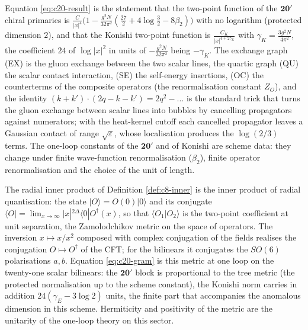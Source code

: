 \begin{remark}
Equation \eqref{eq:c20-result} is the statement that the two-point function of the $\mathbf{20'}$ chiral primaries is $\frac{C}{|x|^4}\big(1-\frac{g^2N}{32\pi^2}(\tfrac{27}2+4\log\tfrac32-8\beta_2)\big)$ with no logarithm (protected dimension $2$), and that the Konishi two-point function is $\frac{C_K}{|x|^{4+2\gamma_K}}$ with $\gamma_K=\frac{3g^2N}{4\pi^2}$, the coefficient $24$ of $\log|x|^2$ in units of $-\frac{g^2N}{32\pi^2}$ being $-\gamma_K$. The exchange graph (EX) is the gluon exchange between the two scalar lines, the quartic graph (QU) the scalar contact interaction, (SE) the self-energy insertions, (OC) the counterterms of the composite operators (the renormalisation constant $Z_O$), and the identity $(k+k')\cdot(2q-k-k')=2q^2-\dots$ is the standard trick that turns the gluon exchange between scalar lines into bubbles by cancelling propagators against numerators; with the heat-kernel cutoff each cancelled propagator leaves a Gaussian contact of range $\sqrt\varepsilon$, whose localisation produces the $\log(2/3)$ terms. The one-loop constants of the $\mathbf{20'}$ and of Konishi are scheme data: they change under finite wave-function renormalisation ($\beta_2$), finite operator renormalisation and the choice of the unit of length.
\end{remark}

\begin{remark}
The radial inner product of Definition \ref{def:c8-inner} is the inner product of radial quantisation: the state $|O\rangle=O(0)|0\rangle$ and its conjugate $\langle O|=\lim_{x\to\infty}|x|^{2\Delta}\langle0|O^\dagger(x)$, so that $\langle O_1|O_2\rangle$ is the two-point coefficient at unit separation, the Zamolodchikov metric on the space of operators. The inversion $x\mapsto x/x^2$ composed with complex conjugation of the fields realises the conjugation $O\mapsto O^\dagger$ of the CFT; for the bilinears it conjugates the $SO(6)$ polarisations $a,b$. Equation \eqref{eq:c20-gram} is this metric at one loop on the twenty-one scalar bilinears: the $\mathbf{20'}$ block is proportional to the tree metric (the protected normalisation up to the scheme constant), the Konishi norm carries in addition $24(\gamma_E-3\log2)$ units, the finite part that accompanies the anomalous dimension in this scheme. Hermiticity and positivity of the metric are the unitarity of the one-loop theory on this sector.
\end{remark}

